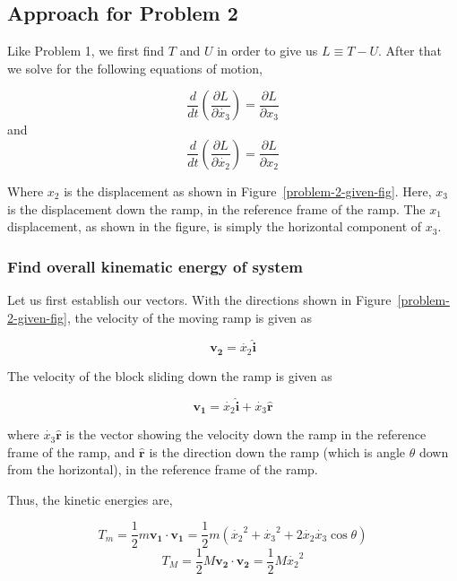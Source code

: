 \documentclass[conference]{IEEEtran}
\begin{document}
\subsection{Approach for Problem 2}
Like Problem 1, we first find $T$ and $U$ in order to give us
$L \equiv T - U$. After that we solve for the following
equations of motion,

\begin{equation} \label{prob2_eq_motion_x1}
    \frac{d}{dt} \left(\frac{\partial L}{\partial \dot{x_3}}\right) = \frac{\partial L}{ \partial x_3}
\end{equation}
and
\begin{equation} \label{prob2_eq_motion_x2}
    \frac{d}{dt} \left(\frac{\partial L}{\partial \dot{x_2}}\right) = \frac{\partial L}{ \partial x_2}
\end{equation}

Where $x_2$ is the displacement as shown in Figure~\ref{problem-2-given-fig}. Here, $x_3$ is the
displacement down the ramp, in the reference frame of the ramp. The $x_1$ displacement, as shown
in the figure, is simply the horizontal component of $x_3$. 

\subsubsection{Find overall kinematic energy of system}

Let us first establish our vectors. With the directions shown in Figure~\ref{problem-2-given-fig},
the velocity of the moving ramp is given as 

\[
    \mathbf{v_2} = \dot{x_2} \hat{\textbf{i}}
\]

The velocity of the block sliding down the ramp is given as

\[
    \mathbf{v_1} = \dot{x_2} \hat{\textbf{i}} + \dot{x_3}\hat{\textbf{r}}
\]

where $\dot{x_3}\hat{\textbf{r}}$ is the vector showing the velocity down the ramp in the reference frame of the
ramp, and $\hat{\textbf{r}}$ is the direction down the ramp (which is angle $\theta$ down from the horizontal),
in the reference frame of the ramp.

Thus, the kinetic energies are,

\[
    T_m = \frac{1}{2} m \mathbf{v_1} \cdot \mathbf{v_1} = \frac{1}{2} m \left( \dot{x_2}^2 + \dot{x_3}^2 + 2\dot{x_2}\dot{x_3}\cos\theta\right)
\]
\[
    T_M = \frac{1}{2} M \mathbf{v_2} \cdot \mathbf{v_2} = \frac{1}{2} M \dot{x_2}^2
\]
\end{document}
